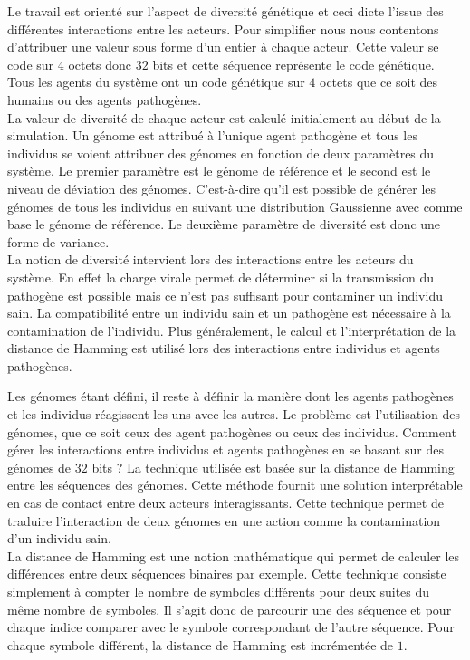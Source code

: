 Le travail est orienté sur l'aspect de diversité génétique et ceci dicte l'issue des différentes interactions entre les acteurs. Pour simplifier nous nous contentons d'attribuer une valeur sous forme d'un entier à chaque acteur. Cette valeur se code sur $4$ octets donc $32$ bits et cette séquence représente le code génétique. Tous les agents du système ont un code génétique sur $4$ octets que ce soit des humains ou des agents pathogènes.\\

La valeur de diversité de chaque acteur est calculé initialement au début de la simulation. Un génome est attribué à l'unique agent pathogène et tous les individus se voient attribuer des génomes en fonction de deux paramètres du système. Le premier paramètre est le génome de référence et le second est le niveau de déviation des génomes. C'est-à-dire qu'il est possible de générer les génomes de tous les individus en suivant une distribution Gaussienne avec comme base le génome de référence. Le deuxième paramètre de diversité est donc une forme de variance.\\

La notion de diversité intervient lors des interactions entre les acteurs du système. En effet la charge virale permet de déterminer si la transmission du pathogène est possible mais ce n'est pas suffisant pour contaminer un individu sain. La compatibilité entre un individu sain et un pathogène est nécessaire à la contamination de l'individu. Plus généralement, le calcul et l'interprétation de la distance de Hamming est utilisé lors des interactions entre individus et agents pathogènes.

Les génomes étant défini, il reste à définir la manière dont les agents pathogènes et les individus réagissent les uns avec les autres. Le problème est l'utilisation des génomes, que ce soit ceux des agent pathogènes ou ceux des individus. Comment gérer les interactions entre individus et agents pathogènes en se basant sur des génomes de $32$ bits ? La technique utilisée est basée sur la distance de Hamming entre les séquences des génomes. Cette méthode fournit une solution interprétable en cas de contact entre deux acteurs interagissants. Cette technique permet de traduire l'interaction de deux génomes en une action comme la contamination d'un individu sain.\\

La distance de Hamming est une notion mathématique qui permet de calculer les différences entre deux séquences binaires par exemple. Cette technique consiste simplement à compter le nombre de symboles différents pour deux suites du même nombre de symboles. Il s'agit donc de parcourir une des séquence et pour chaque indice comparer avec le symbole correspondant de l'autre séquence. Pour chaque symbole différent, la distance de Hamming est incrémentée de $1$.\\

